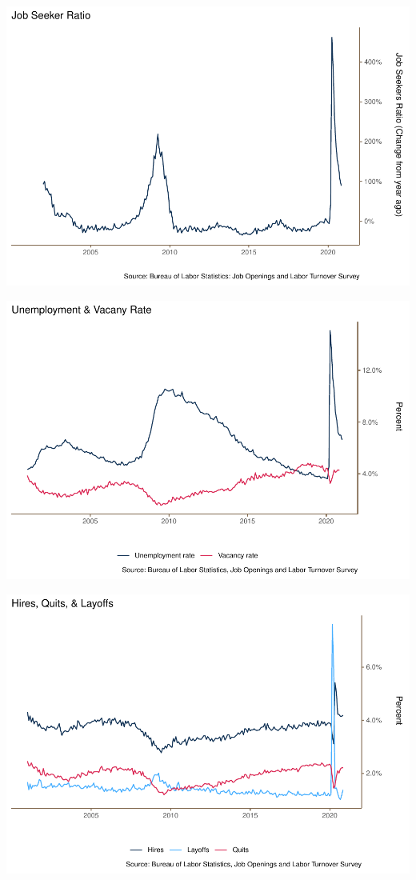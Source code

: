\documentclass[
  11pt,
]{article}
\begin{document}
\begin{center}\includegraphics{JOLTS_files/figure-latex/unnamed-chunk-5-1} \end{center}

\begin{center}\includegraphics{JOLTS_files/figure-latex/unnamed-chunk-6-1} \end{center}

\begin{center}\includegraphics{JOLTS_files/figure-latex/unnamed-chunk-7-1} \end{center}
\end{document}
